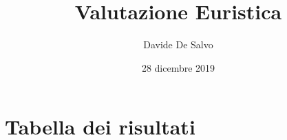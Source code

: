 \documentclass[french]{article}
\title{Valutazione Euristica}
\author{Davide De Salvo}
\date{28 dicembre 2019}
\begin{document}
\maketitle

\section{Tabella dei risultati}




\end{document}

